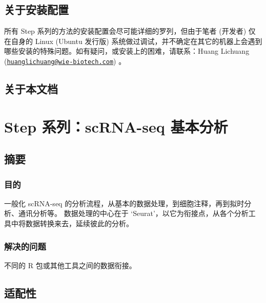 \documentclass[
]{article}
\begin{document}
\hypertarget{ux5173ux4e8eux5b89ux88c5ux914dux7f6e}{%
\subsection{关于安装配置}\label{ux5173ux4e8eux5b89ux88c5ux914dux7f6e}}

所有 Step 系列的方法的安装配置会尽可能详细的罗列，但由于笔者 (开发者) 仅在自身的 Linux (Ubuntu 发行版) 系统做过调试，并不确定在其它的机器上会遇到哪些安装的特殊问题。如有疑问，或安装上的困难，请联系：Huang Lichuang (\href{mailto:huanglichuang@wie-biotech.com}{\nolinkurl{huanglichuang@wie-biotech.com}}) 。

\hypertarget{ux5173ux4e8eux672cux6587ux6863}{%
\subsection{关于本文档}\label{ux5173ux4e8eux672cux6587ux6863}}

\hypertarget{step-ux7cfbux5217scrna-seq-ux57faux672cux5206ux6790}{%
\section{Step 系列：scRNA-seq 基本分析}\label{step-ux7cfbux5217scrna-seq-ux57faux672cux5206ux6790}}

\hypertarget{abstract}{%
\subsection{摘要}\label{abstract}}

\hypertarget{ux76eeux7684}{%
\subsubsection{目的}\label{ux76eeux7684}}

一般化 scRNA-seq 的分析流程，从基本的数据处理，到细胞注释，再到拟时分析、通讯分析等。
数据处理的中心在于 `Seurat'，以它为衔接点，从各个分析工具中将数据转换来去，延续彼此的分析。

\hypertarget{ux89e3ux51b3ux7684ux95eeux9898}{%
\subsubsection{解决的问题}\label{ux89e3ux51b3ux7684ux95eeux9898}}

不同的 R 包或其他工具之间的数据衔接。

\hypertarget{ux9002ux914dux6027}{%
\subsection{适配性}\label{ux9002ux914dux6027}}
\end{document}
